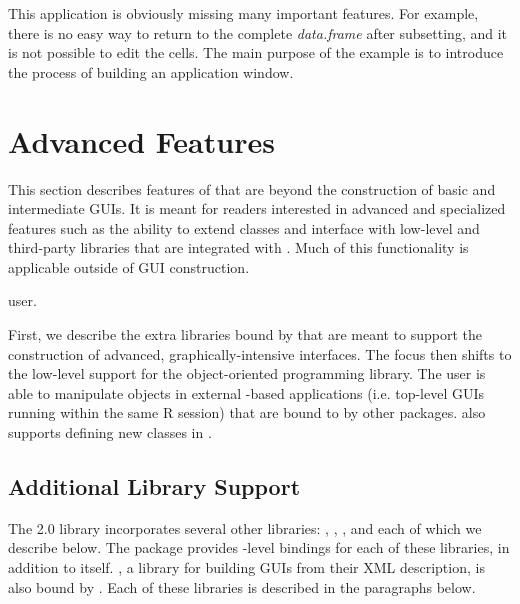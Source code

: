 \documentclass[article]{jss}
\begin{document}
This application is obviously missing many important features. For
example, 
there is no easy way to return to the complete \emph{data.frame} after
subsetting, and
it is not possible to edit the cells. The main purpose of the example
is to
introduce the process of building an application window.

\section{Advanced Features}

This section describes features of  that are beyond the
construction of basic and intermediate GUIs. It is meant for readers
interested in advanced and specialized  features such as
the ability to extend  classes and interface with low-level
and third-party libraries that are integrated with . Much of this functionality is applicable outside of GUI construction.

user.

First, we describe the extra libraries bound by  that are
meant to support the construction of advanced, graphically-intensive
interfaces. The focus then shifts to the low-level support for the
 object-oriented programming library. The 
user is able to manipulate objects in external -based
applications (i.e. top-level GUIs running within the same R session)
that are bound to  by other packages.  also
supports defining new  classes in .

\subsection{Additional Library Support}

The  2.0 library incorporates several other libraries:
, , ,  and 
each of which we describe below.  The  package provides
-level bindings for each of these libraries, in addition
to  itself.  , a library for building GUIs
from their XML description, is also bound by . Each of
these libraries is described in the paragraphs below.

\paragraph[Cairo]{} 
\end{document}

